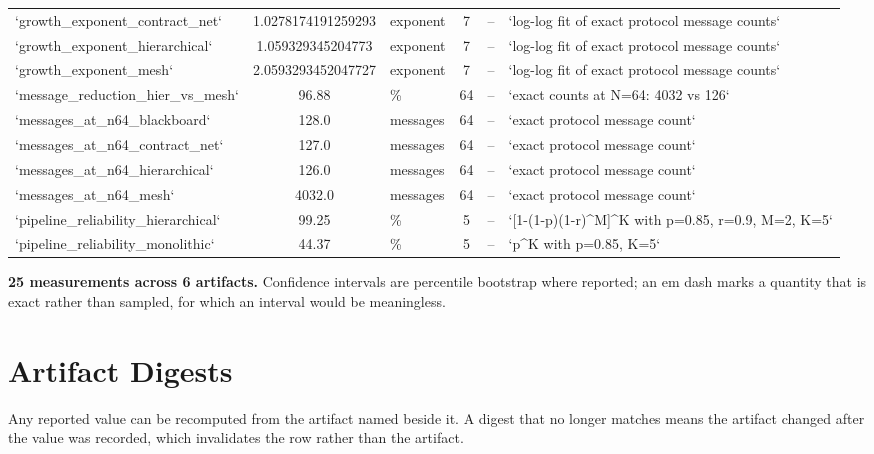 \documentclass[10pt,journal,compsoc,twocolumn]{IEEEtran}
\begin{document}
\begin{table}[htbp]
{\begin{tabular}{lclcll}
`growth\_exponent\_contract\_net` & 1.0278174191259293 & exponent & 7 & -- & `log-log fit of exact protocol message counts` \\
`growth\_exponent\_hierarchical` & 1.059329345204773 & exponent & 7 & -- & `log-log fit of exact protocol message counts` \\
`growth\_exponent\_mesh` & 2.0593293452047727 & exponent & 7 & -- & `log-log fit of exact protocol message counts` \\
`message\_reduction\_hier\_vs\_mesh` & 96.88 & \% & 64 & -- & `exact counts at N=64: 4032 vs 126` \\
`messages\_at\_n64\_blackboard` & 128.0 & messages & 64 & -- & `exact protocol message count` \\
`messages\_at\_n64\_contract\_net` & 127.0 & messages & 64 & -- & `exact protocol message count` \\
`messages\_at\_n64\_hierarchical` & 126.0 & messages & 64 & -- & `exact protocol message count` \\
`messages\_at\_n64\_mesh` & 4032.0 & messages & 64 & -- & `exact protocol message count` \\
`pipeline\_reliability\_hierarchical` & 99.25 & \% & 5 & -- & `[1-(1-p)(1-r)^M]^K with p=0.85, r=0.9, M=2, K=5` \\
`pipeline\_reliability\_monolithic` & 44.37 & \% & 5 & -- & `p^K with p=0.85, K=5` \\
\bottomrule
\end{tabular}}
\end{table}

\textbf{25 measurements across 6 artifacts.} Confidence intervals are percentile bootstrap where reported; an em dash marks a quantity that is exact rather than sampled, for which an interval would be meaningless.


\section{Artifact Digests}
\begin{table}[htbp]
\centering
{}
\end{table}

Any reported value can be recomputed from the artifact named beside it. A digest that no longer matches means the artifact changed after the value was recorded, which invalidates the row rather than the artifact.


\par\vspace{0.5em}



\end{document}
